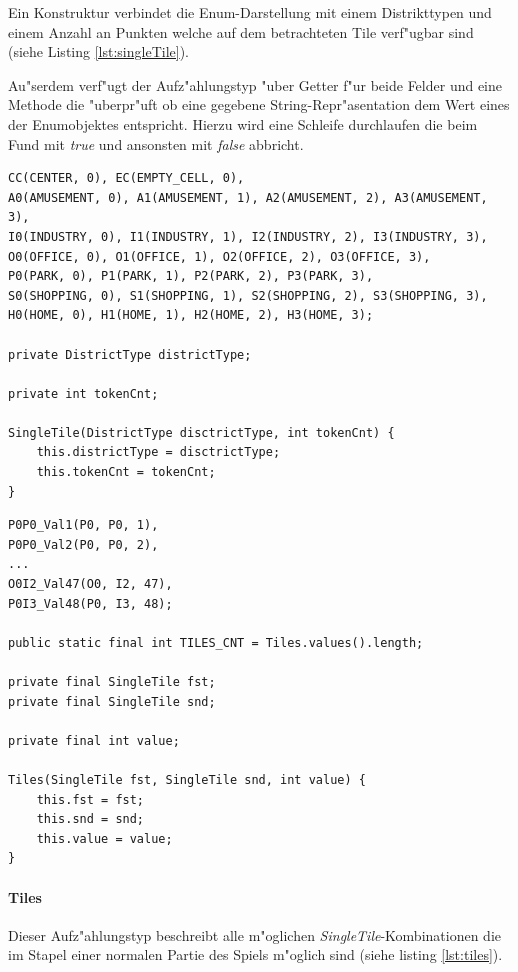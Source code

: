 Ein Konstruktur verbindet die Enum-Darstellung mit einem Distrikttypen und einem Anzahl an Punkten welche auf dem betrachteten Tile verf"ugbar sind (siehe Listing \ref{lst:singleTile}).

Au"serdem verf"ugt der Aufz"ahlungstyp "uber Getter f"ur beide Felder und eine Methode die "uberpr"uft ob eine gegebene String-Repr"asentation dem Wert eines der Enumobjektes entspricht. Hierzu wird eine Schleife durchlaufen die beim Fund mit \emph{true} und ansonsten mit \emph{false} abbricht. 

\begin{lstlisting}[style=CodeHighlighting,float,caption=singleTile,label=lst:singleTile]
CC(CENTER, 0), EC(EMPTY_CELL, 0),
A0(AMUSEMENT, 0), A1(AMUSEMENT, 1), A2(AMUSEMENT, 2), A3(AMUSEMENT, 3),
I0(INDUSTRY, 0), I1(INDUSTRY, 1), I2(INDUSTRY, 2), I3(INDUSTRY, 3),
O0(OFFICE, 0), O1(OFFICE, 1), O2(OFFICE, 2), O3(OFFICE, 3),
P0(PARK, 0), P1(PARK, 1), P2(PARK, 2), P3(PARK, 3),
S0(SHOPPING, 0), S1(SHOPPING, 1), S2(SHOPPING, 2), S3(SHOPPING, 3),
H0(HOME, 0), H1(HOME, 1), H2(HOME, 2), H3(HOME, 3);

private DistrictType districtType;

private int tokenCnt;

SingleTile(DistrictType disctrictType, int tokenCnt) {
    this.districtType = disctrictType;
    this.tokenCnt = tokenCnt;
}
\end{lstlisting}

\begin{lstlisting}[style=CodeHighlighting,float,caption=Tiles,label=lst:tiles]
P0P0_Val1(P0, P0, 1),
P0P0_Val2(P0, P0, 2),
...
O0I2_Val47(O0, I2, 47),
P0I3_Val48(P0, I3, 48);

public static final int TILES_CNT = Tiles.values().length;

private final SingleTile fst;
private final SingleTile snd;

private final int value;

Tiles(SingleTile fst, SingleTile snd, int value) {
    this.fst = fst;
    this.snd = snd;
    this.value = value;
}
\end{lstlisting}

\clearpage
\paragraph{Tiles}
\label{par:tiles}
Dieser Aufz"ahlungstyp beschreibt alle m"oglichen \emph{SingleTile}-Kombinationen die im Stapel einer normalen Partie des Spiels m"oglich sind (siehe listing \ref{lst:tiles}). 

